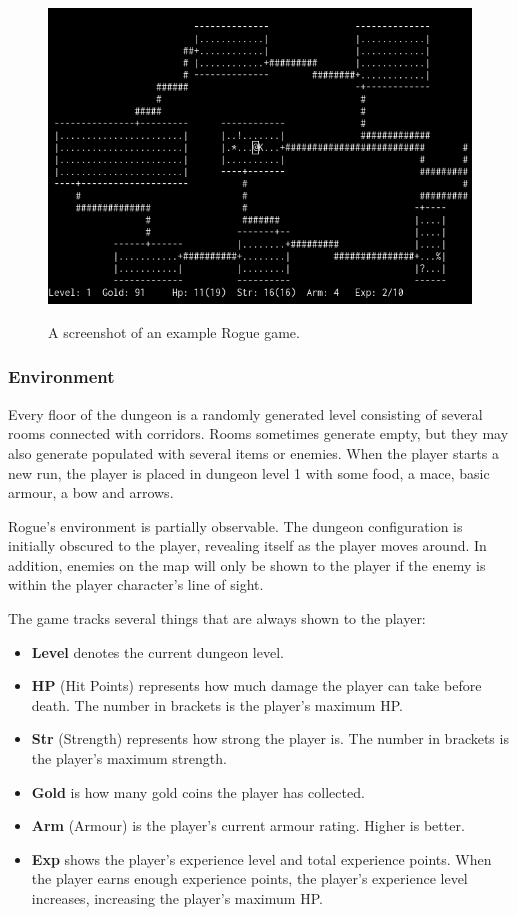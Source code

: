 \documentclass[11pt,a4paper]{article}
\begin{document}
\begin{figure}[t]
	\caption{A screenshot of an example Rogue game.}
	\centering
	\includegraphics[scale=0.5]{rogue_screenshot}
	\label{rogsc}
\end{figure}
\subsubsection{Environment}
Every floor of the dungeon is a randomly generated level consisting of several rooms connected with corridors. Rooms sometimes generate empty, but they may also generate populated with several items or enemies. When the player starts a new run, the player is placed in dungeon level 1 with some food, a mace, basic armour, a bow and arrows. 

Rogue's environment is partially observable. The dungeon configuration is initially obscured to the player, revealing itself as the player moves around. In addition, enemies on the map will only be shown to the player if the enemy is within the player character's line of sight.

The game tracks several things that are always shown to the player:
\begin{itemize}
    \item \textbf{Level} denotes the current dungeon level.
    \item \textbf{HP} (Hit Points) represents how much damage the player can take before death. The number in brackets is the player's maximum HP.
    \item \textbf{Str} (Strength) represents how strong the player is. The number in brackets is the player's maximum strength.
    \item \textbf{Gold} is how many gold coins the player has collected.
    \item \textbf{Arm} (Armour) is the player's current armour rating. Higher is better.
    \item \textbf{Exp} shows the player's experience level and total experience points. When the player earns enough experience points, the player's experience level increases, increasing the player's maximum HP.
\end{itemize}
\end{document}
